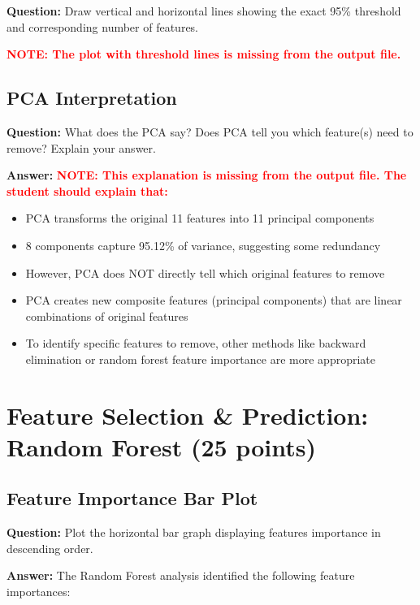 \documentclass[11pt]{article}
\begin{document}
\textbf{Question:} Draw vertical and horizontal lines showing the exact 95\% threshold and corresponding number of features.

\textcolor{red}{\textbf{NOTE: The plot with threshold lines is missing from the output file.}}

\subsection{PCA Interpretation}

\textbf{Question:} What does the PCA say? Does PCA tell you which feature(s) need to remove? Explain your answer.

\textbf{Answer:} \textcolor{red}{\textbf{NOTE: This explanation is missing from the output file. The student should explain that:}}
\begin{itemize}
    \item PCA transforms the original 11 features into 11 principal components
    \item 8 components capture 95.12\% of variance, suggesting some redundancy
    \item However, PCA does NOT directly tell which original features to remove
    \item PCA creates new composite features (principal components) that are linear combinations of original features
    \item To identify specific features to remove, other methods like backward elimination or random forest feature importance are more appropriate
\end{itemize}

\section{Feature Selection \& Prediction: Random Forest (25 points)}

\subsection{Feature Importance Bar Plot}

\textbf{Question:} Plot the horizontal bar graph displaying features importance in descending order.

\textbf{Answer:} The Random Forest analysis identified the following feature importances:
\end{document}
